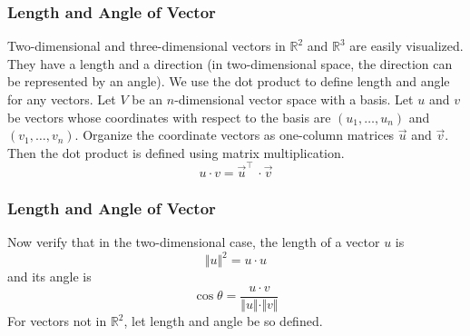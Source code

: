 \documentclass[xcolor=dvipsnames]{beamer}
\begin{document}
\begin{frame}
  \frametitle{Length and Angle of Vector}
  Two-dimensional and three-dimensional vectors in $\mathbb{R}^{2}$
  and $\mathbb{R}^{3}$ are easily visualized. They have a length and a
  direction (in two-dimensional space, the direction can be
  represented by an angle). We use the dot product to define length
  and angle for any vectors. Let $V$ be an $n$-dimensional vector
  space with a basis. Let $u$ and $v$ be vectors whose coordinates
  with respect to the basis are $(u_{1},{\ldots},u_{n})$ and
  $(v_{1},{\ldots},v_{n})$. Organize the coordinate vectors as
  one-column matrices $\vec{u}$ and $\vec{v}$. Then the dot product is
  defined using matrix multiplication.
  \begin{equation}
    \label{eq:emiehoij}
    u\cdot{}v=\vec{u}^{\intercal}\,\cdot\vec{v}
  \end{equation}
\end{frame}

\begin{frame}
  \frametitle{Length and Angle of Vector}
  Now verify that in the two-dimensional case, the length of a vector $u$
  is
  \begin{equation}
    \label{eq:zuabiemu}
    \Vert{}u\Vert^{2}=u\cdot{}u
  \end{equation}
  and its angle is
  \begin{equation}
    \label{eq:iechaigu}
    \cos\theta=\frac{u\cdot{}v}{\Vert{}u\Vert\cdot\Vert{}v\Vert}
  \end{equation}
  For vectors not in $\mathbb{R}^{2}$, let length and angle be so defined.
\end{frame}

\end{document}
